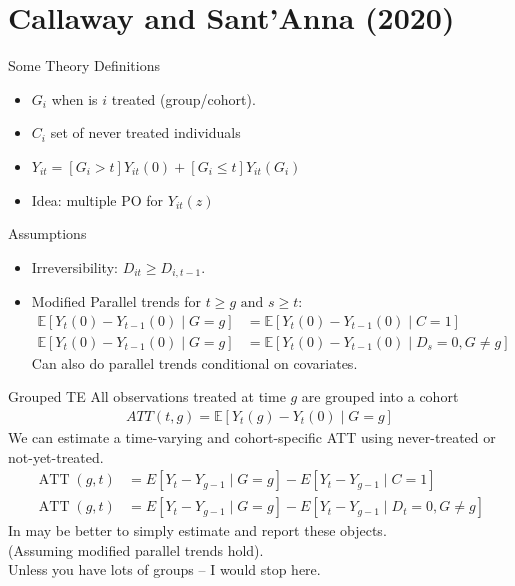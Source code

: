 \documentclass[aspectratio=169,11pt]{beamer}
\begin{document}
\section*{Callaway and Sant'Anna (2020)}
\begin{frame}{Some Theory}
Definitions
\begin{itemize}
\item $G_i$ when is $i$ treated (group/cohort).
\item $C_i$ set of never treated individuals
\item $Y_{it} = [G_i > t] Y_{it}(0) + [G_i \leq t] Y_{it}(G_i) $
\item Idea: multiple PO for $Y_{it}(z)$
\end{itemize}

Assumptions
\begin{itemize}
\item Irreversibility: $D_{it} \geq D_{i,t-1}$.
\item Modified Parallel trends for $t \geq g \text { and } s \geq t$:
\begin{align*}
\mathbb{E}\left[Y_{t}(0)-Y_{t-1}(0) \mid G=g\right]&=\mathbb{E}\left[Y_{t}(0)-Y_{t-1}(0) \mid C=1\right] \\
\mathbb{E}\left[Y_{t}(0)-Y_{t-1}(0) \mid G=g\right]&=\mathbb{E}\left[Y_{t}(0)-Y_{t-1}(0) \mid D_{s}=0, G \neq g\right]
\end{align*}
Can also do parallel trends \alert{conditional on covariates}.
\end{itemize}
\end{frame}

\begin{frame}{Grouped TE}
\small
All observations treated at time $g$ are grouped into a \alert{cohort}
\begin{align*}
ATT(t,g) = \mathbb{E}\left[Y_{t}(g)-Y_{t}(0) \mid G=g\right]
\end{align*}
We can estimate a \alert{time-varying} and \alert{cohort-specific} ATT using \alert{never-treated} or \alert{not-yet-treated}.
\begin{align*}
\operatorname{ATT}(g, t)&=E\left[Y_{t}-Y_{g-1} \mid G=g\right]-E\left[Y_{t}-Y_{g-1} \mid C=1\right] \\
\operatorname{ATT}(g, t)&=E\left[Y_{t}-Y_{g-1} \mid G=g\right]-E\left[Y_{t}-Y_{g-1} \mid D_{t}=0, G \neq g\right]
\end{align*}
In may be better to simply estimate and report these objects.\\
 (Assuming modified parallel trends hold).\\
 Unless you have lots of groups -- I would stop here.
\end{frame}
\end{document}
